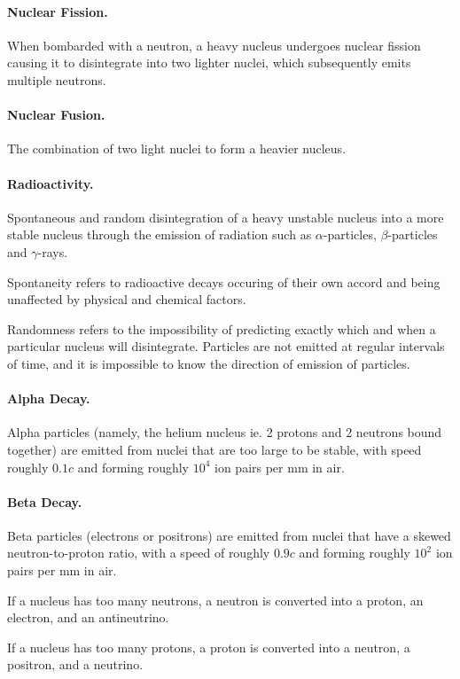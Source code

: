 \documentclass{article}
\begin{document}
\paragraph{Nuclear Fission.} When bombarded with a neutron, a heavy nucleus undergoes nuclear fission causing it to disintegrate into two lighter nuclei, which subsequently emits multiple neutrons.

\paragraph{Nuclear Fusion.} The combination of two light nuclei to form a heavier nucleus.

\paragraph{Radioactivity.} Spontaneous and random disintegration of a heavy unstable nucleus into a more stable nucleus through the emission of radiation such as $\alpha$-particles, $\beta$-particles and $\gamma$-rays.

Spontaneity refers to radioactive decays occuring of their own accord and being unaffected by physical and chemical factors.

Randomness refers to the impossibility of predicting exactly which and when a particular nucleus will disintegrate. Particles are not emitted at regular intervals of time, and it is impossible to know the direction of emission of particles.

\paragraph{Alpha Decay.} Alpha particles (namely, the helium nucleus ie. 2 protons and 2 neutrons bound together) are emitted from nuclei that are too large to be stable, with speed roughly $0.1c$ and forming roughly $10^4$ ion pairs per mm in air.

\paragraph{Beta Decay.} Beta particles (electrons or positrons) are emitted from nuclei that have a skewed neutron-to-proton ratio, with a speed of roughly $0.9c$ and forming roughly $10^2$ ion pairs per mm in air.

If a nucleus has too many neutrons, a neutron is converted into a proton, an electron, and an antineutrino.

If a nucleus has too many protons, a proton is converted into a neutron, a positron, and a neutrino.
\end{document}
